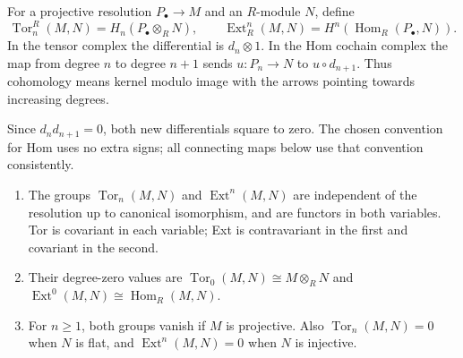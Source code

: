 \begin{definition}\label{def:torext}
For a projective resolution $P_\bullet\to M$ and an $R$-module $N$, define
\[
\operatorname{Tor}_n^R(M,N)=H_n(P_\bullet\otimes_R N),\qquad
\operatorname{Ext}^n_R(M,N)=H^n(\operatorname{Hom}_R(P_\bullet,N)).
\]
In the tensor complex the differential is $d_n\otimes1$. In the Hom cochain complex the map from degree $n$ to degree $n+1$ sends $u:P_n\to N$ to $u\circ d_{n+1}$. Thus cohomology means kernel modulo image with the arrows pointing towards increasing degrees.
\end{definition}

Since $d_nd_{n+1}=0$, both new differentials square to zero. The chosen convention for Hom uses no extra signs; all connecting maps below use that convention consistently.

\begin{proposition}\label{prop:torextbasic}
\leavevmode
\begin{enumerate}[label=(\alph*)]
\item The groups $\operatorname{Tor}_n(M,N)$ and $\operatorname{Ext}^n(M,N)$ are independent of the resolution up to canonical isomorphism, and are functors in both variables. Tor is covariant in each variable; Ext is contravariant in the first and covariant in the second.
\item Their degree-zero values are
$\operatorname{Tor}_0(M,N)\cong M\otimes_RN$ and
$\operatorname{Ext}^0(M,N)\cong\operatorname{Hom}_R(M,N)$.
\item For $n\ge1$, both groups vanish if $M$ is projective. Also $\operatorname{Tor}_n(M,N)=0$ when $N$ is flat, and $\operatorname{Ext}^n(M,N)=0$ when $N$ is injective.
\end{enumerate}
\end{proposition}

